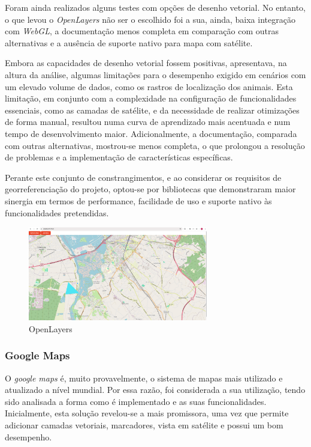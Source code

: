 Foram ainda realizados alguns testes com opções de desenho vetorial. No entanto, o que levou o \textit{OpenLayers} não ser o escolhido foi a sua, ainda, baixa integração com \textit{WebGL}, a documentação menos completa em comparação com outras alternativas e a ausência de suporte nativo para mapa com satélite. 

Embora as capacidades de desenho vetorial fossem positivas, apresentava, na altura da análise, algumas limitações para o desempenho exigido em cenários com um elevado volume de dados, como os rastros de localização dos animais. Esta limitação, em conjunto com a complexidade na configuração de funcionalidades essenciais, como as camadas de satélite, e da necessidade de realizar otimizações de forma manual, resultou numa curva de aprendizado mais acentuada e num tempo de desenvolvimento maior. Adicionalmente, a documentação, comparada com outras alternativas, mostrou-se menos completa, o que prolongou a resolução de problemas e a implementação de características específicas. 

Perante este conjunto de constrangimentos, e ao considerar os requisitos de georreferenciação do projeto, optou-se por bibliotecas que demonstraram maior sinergia em termos de performance, facilidade de uso e suporte nativo às funcionalidades pretendidas.

\begin{figure}[!h]
	\centering
	\includegraphics[width=0.7\textwidth]{figs/ol.png}
	\caption[Open Layers]{OpenLayers}
	\label{fig:ol}
\end{figure}

\subsubsection{\textbf{Google Maps}}\label{sec:sub_gm}
O \textit{google maps} é, muito provavelmente, o sistema de mapas mais utilizado e atualizado a nível mundial. Por essa razão, foi considerada a sua utilização, tendo sido analisada a forma como é implementado e as suas funcionalidades. Inicialmente, esta solução revelou-se a mais promissora, uma vez que permite adicionar camadas vetoriais, marcadores, vista em satélite e possui um bom desempenho. 

